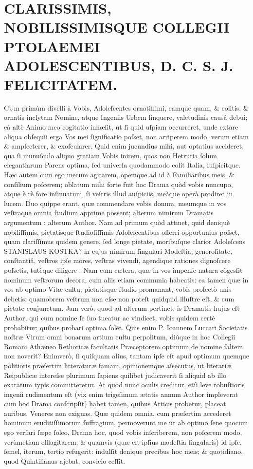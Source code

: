 \documentclass[a4paper,12pt]{article}
\begin{document}
\section{CLARISSIMIS, NOBILISSIMISQUE COLLEGII PTOLAEMEI ADOLESCENTIBUS, D. C. S. J. FELICITATEM.}
\label{sec:org32c8b46}
CUm primùm divelli à Vobis, Adoleſcentes ornatiſſimi, eamque quam, \& colitis, \& ornatis inclytam Nomine, atque Ingeniis Urbem linquere, valetudinis causâ debui; eâ altè Animo meo cogitatio inhæſit, ut ſi quid uſpiam occurreret, unde extare aliqua obſequii erga Vos mei ſignificatio poſset, non arriperem modo, verum etiam \& amplecterer, \& exoſcularer. Quid enim jucundius mihi, aut optatius accideret, qua ſi munuſculo aliquo gratiam  Vobis inirem, quos non Hetruria ſolum elegantiarum Parens optima, ſed univerſa quodammodo colit Italia, ſuſpicitque. Hæc autem cum ego mecum agitarem, opemque ad id à Familiaribus meis, \& conſilium poſcerem; oblatum mihi forte fuit hoc Drama quòd vobis nuncupo, atque è rè fore inſinuatum, ſi veſtris illud auſpiciis, meàque operà prodiret in lucem. Duo quippe erant, quæ commendare vobis donum, meumque in vos veſtraque omnia ſtudium apprime possent; alterum nimirum Dramatis argumentum : alterum Author. Nam ad primum quòd attinet, quid deniquè nobiliſſimis, pietatisque ſtudioſiſſimis Adoleſcentibus offerri opportunius poſset, quam clariſſimus quidem genere, ſed longe pietate, moribuſque clarior Adoleſcens STANISLAUS KOSTKA? in cujus nimirum ſingulari Modeſtia, generoſitate, conſtantiâ, veſtros ipſe mores, veſtras vivendi, agendique rationes dignoſcere poſsetis, tutèque diligere : Nam cum cætera, quæ in vos impenſe natura cõgesſit nominum veſtrorum decora, cum aliis etiam communia habeatis: ea tamen quæ in vos ab optimo Vitæ cultu, pietatisque ſtudio promanant, vobis profectò unis debetis; quamobrem veſtrum non eſse non poteſt quidquid illuſtre eſt, \& cum pietate conjunctum. Jam verò, quod ad alterum pertinet, is Dramatis hujus eſt Author, qui cum nomine ſe ſuo tueatur ac vindicet, vobis quidem certè probabitur; quibus probari optima ſolẽt. Quis enim P. Ioannem Luccari Societatis noſtræ Virum omni bonarum artium cultu perpolitum, diùque in hoc Collegii Romani Athæneo Rethoricæ facultatis Præceptorem optimum de nomine ſaltem non noverit? Enimverò, ſi quiſquam alius, tantam ipſe eſt apud optimum quemque politioris præſertim litteraturæ famam, opinionemque aſsecutus, ut literariæ Reipublicæ intereſse plurimum ſapiens quilibet judicaverit ſi aliquid ab illo exaratum typis committeretur. At quod nunc oculis creditur, etſi leve robuſtioris ingenii rudimentum eſt (vix enim trigeſimum ætatis annum Author impleverat cum hoc Drama conſcripſit) habet tamen, quibus Atticis probetur,  placeat auribus, Veneres non exiguas. Quæ quidem omnia, cum præſertim accederet hominum eruditiſſimorum ſuffragium, permoverunt me ut ab optimo ſene quocum ego verſari ſæpe ſoleo, Drama hoc, quod vobis inſcriberem, non poſcerem modo, verùmetiam efflagitarem; \& quamvis (quæ eſt ipſius modeſtia ſingularis) id ipſe, ſemel, iterum, tertio refugerit: indulſit denique precibus hoc meis; \& quotidiano, quod Quintilianus ajebat, convicio ceſſit.
\end{document}
